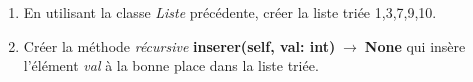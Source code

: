 \documentclass[a4paper,11pt]{article}
\begin{document}
\begin{Form}
\begin{exo}
\begin{figure}[!h]
\end{figure}
\end{exo}

\begin{exo}
\begin{enumerate}
\item En utilisant la classe \emph{Liste} précédente, créer la liste triée 1,3,7,9,10.
\item Créer la méthode \emph{récursive} \textbf{inserer(self, val: int)$\;\rightarrow\;$None} qui insère l'élément \emph{val} à la bonne place dans la liste triée.
\end{enumerate}
\end{exo}


\end{Form}
\end{document}
